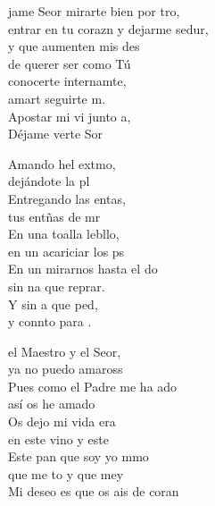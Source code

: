 \begin{cancion}%
	jame Seor mirarte bien por tro,\\
	entrar en tu corazn y dejarme sedur,\\
	y que aumenten mis des \\
	de querer ser como Tú\\
	conocerte internamte, \\
	amart seguirte m.\\
	Apostar mi vi junto a,\\
	Déjame verte Sor\jump\\
	\begin{chorus}%
		Amando hel extmo, \\
		dejándote la pl\\
		Entregando las entas,  \\
		tus entñas de mr\\
		En una toalla lebllo, \\
		en un acariciar los ps\\
		En un mirarnos hasta el do \\
		sin na que reprar.\\
		Y sin a que ped, \\
		y connto para .\jump\\
	\end{chorus}%
	 el Maestro y el Seor, \\
	ya no puedo amaross \\
	Pues como el Padre me ha ado \\
	así os he amado \\
	Os dejo mi vida era \\
	en este vino y este \\
	Este pan que soy yo mmo \\
	que me to y que mey\\
	Mi deseo es que os ais de coran \\

\end{cancion}
